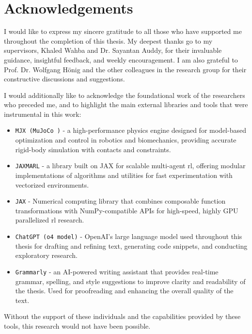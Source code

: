 \chapter*{Acknowledgements}
\thispagestyle{empty}

I would like to express my sincere gratitude to all those who have supported me throughout the completion of this thesis. My deepest thanks go to my supervisors, Khaled Wahba and Dr. Sayantan Auddy, for their invaluable guidance, insightful feedback, and weekly encouragement. I am also grateful to Prof. Dr. Wolfgang Hönig and the other colleagues in the research group for their constructive discussions and suggestions.

I would additionally like to acknowledge the foundational work of the researchers who preceded me, and to highlight the main external libraries and tools that were instrumental in this work:

\begin{itemize}
  \item \texttt{MJX (MuJoCo \cite{todorov2012mujoco})} - a high-performance physics engine designed for model-based optimization and control in robotics and biomechanics, providing accurate rigid-body simulation with contacts and constraints.
  \item \texttt{JAXMARL} \cite{flair2023jaxmarl}  - a library built on JAX for scalable multi-agent \gls{rl}, offering modular implementations of algorithms and utilities for fast experimentation with vectorized environments.
  \item \texttt{JAX} \cite{jax2018github} - Numerical computing library that combines composable function transformations with NumPy-compatible APIs for high-speed, highly GPU parallelized \gls{rl} research.
  \item \texttt{ChatGPT (o4 model)} - OpenAI's large language model used throughout this thesis for drafting and refining text, generating code snippets, and conducting exploratory research.
  \item \texttt{Grammarly} - an AI-powered writing assistant that provides real-time grammar, spelling, and style suggestions to improve clarity and readability of the thesis. Used for proofreading and enhancing the overall quality of the text.
\end{itemize}

\vspace{1em}
\noindent
Without the support of these individuals and the capabilities provided by these tools, this research would not have been possible.
